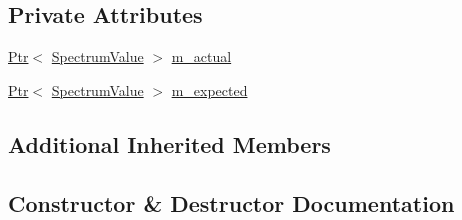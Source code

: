 \subsection*{Private Attributes}
\begin{DoxyCompactItemize}
\item 
\hyperlink{classns3_1_1Ptr}{Ptr}$<$ \hyperlink{classns3_1_1SpectrumValue}{Spectrum\+Value} $>$ \hyperlink{classLteDownlinkPowerControlSpectrumValueTestCase_a24aef4fd84236fe9d2c66da397971acc}{m\+\_\+actual}
\item 
\hyperlink{classns3_1_1Ptr}{Ptr}$<$ \hyperlink{classns3_1_1SpectrumValue}{Spectrum\+Value} $>$ \hyperlink{classLteDownlinkPowerControlSpectrumValueTestCase_a6615e7aab6c6d83be1dd11c5d4b797ef}{m\+\_\+expected}
\end{DoxyCompactItemize}
\subsection*{Additional Inherited Members}


\subsection{Constructor \& Destructor Documentation}
